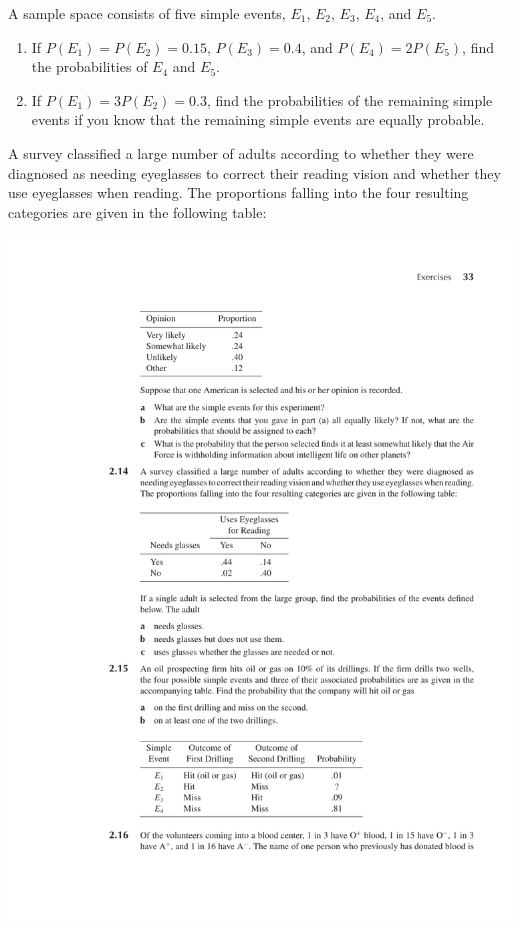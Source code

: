 \documentclass[12pt,reqno]{amsart}
\begin{document}
\prob A sample space consists of five simple events, $E_1$, $E_2$, $E_3$, $E_4$, and $E_5$.

\medskip
\begin{enumerate}
    \item If $P(E_1) = P(E_2) = 0.15$, $P(E_3) = 0.4$, and $P(E_4) = 2P(E_5)$, find the probabilities of $E_4$ and $E_5$.\vfill
    


    \item If $P(E_1) = 3P(E_2) = 0.3$, find the probabilities of the remaining simple events if you know that the remaining simple events are equally probable.\vfill
    

    
\end{enumerate}















\newpage
\prob A survey classified a large number of adults according to whether they were diagnosed as needing eyeglasses to correct their reading vision and whether they use eyeglasses when reading. The proportions falling into the four resulting categories are given in the following table:

\medskip
\begin{center}
\includegraphics[scale=1]{pic.pdf}
\end{center}
\medskip
\end{document}

